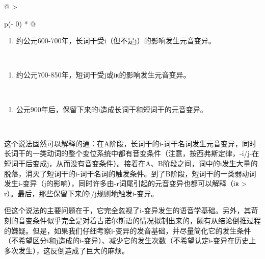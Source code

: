 \begin{longtable}[]{@{}
  >{\raggedright\arraybackslash}p{(\columnwidth - 0\tabcolsep) * }@{}}
  \toprule\noalign{}
  \begin{minipage}[b]{\linewidth}\raggedright
    \begin{enumerate}
      \def\labelenumi{\Alph{enumi}.}
      \item
            约公元600-700年，长词干受i（但不是j）的影响发生元音变异。
    \end{enumerate}
  \end{minipage} \\
  \midrule\noalign{}
  \endhead
  \bottomrule\noalign{}
  \endlastfoot
  \begin{minipage}[t]{\linewidth}\raggedright
    \begin{enumerate}
      \def\labelenumi{\Alph{enumi}.}
      \setcounter{enumi}{1}
      \item
            约公元700-850年，短词干受j或iʀ的影响发生元音变异。
    \end{enumerate}
  \end{minipage} \\
  \begin{minipage}[t]{\linewidth}\raggedright
    \begin{enumerate}
      \def\labelenumi{\Alph{enumi}.}
      \setcounter{enumi}{2}
      \item
            公元900年后，保留下来的i造成长词干和短词干的元音变异。
    \end{enumerate}
  \end{minipage} \\
\end{longtable}

这个说法固然可以解释的通：在A阶段，长词干的i-词干名词发生元音变异，同时长词干的一类动词的整个变位系统中都有音变条件（注意，按西弗斯定律，-i/j-在短词干后变成j，从而没有音变条件）。接着在A、B阶段之间，词中的i发生大量的脱落，消灭了短词干的i-词干名词的触发条件。到了B阶段，短词干的一类弱动词发生i-变异（j的影响），同时许多由-r词尾引起的元音变异也都可以解释（iʀ
\textgreater{} r）。最后，那些保留下来的i/j规则地触发i-变异。

但这个说法的主要问题在于，它完全忽视了i-变异发生的语音学基础。另外，其苛刻的音变条件似乎完全是对着古诺尔斯语的情况拟制出来的，颇有从结论倒推过程的嫌疑。但是，如果我们仔细考察i-变异的发音基础，并尽量简化它的发生条件（不希望区分i和j造成的i-变异）、减少它的发生次数（不希望认定i-变异在历史上多次发生），这反倒造成了巨大的麻烦。

